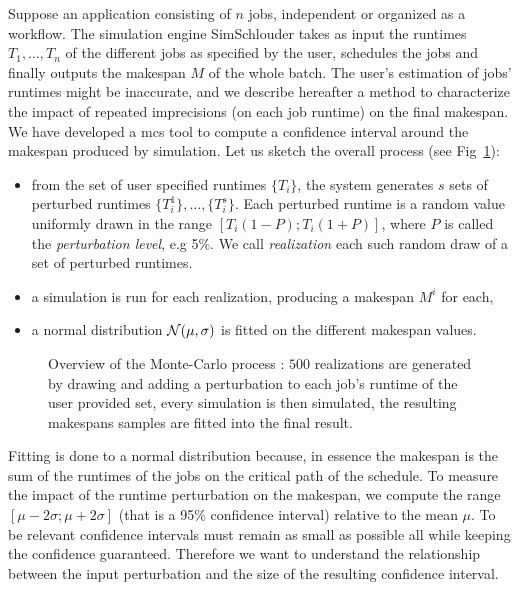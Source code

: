 \documentclass[10pt,conference,compsocconf]{IEEEtran}
\begin{document}
Suppose an  application consisting of  $n$ jobs,  independent or organized  as a
workflow.   The  simulation engine  SimSchlouder  takes  as input  the  runtimes
$T_1, \ldots ,  T_n$ of the different  jobs as specified by  the user, schedules
the jobs and  finally outputs the makespan  $M$ of the whole  batch.  The user's
estimation of  jobs' runtimes might be  inaccurate, and we describe  hereafter a
method to characterize the impact of repeated imprecisions (on each job runtime)
on the  final makespan.  We  have developed a \ac{mcs}  tool to compute a
confidence interval around the makespan produced   by   simulation.   Let   us
sketch   the   overall   process   (see Fig~\ref{fig:mc-process}):
\begin{itemize} 
\item from  the set of user  specified runtimes $\{T_i\}$, the  system generates
  $s$ sets of perturbed runtimes  $\{T_i^1\}, \ldots, \{T_i^s\}$. Each perturbed
  runtime    is   a    random   value    uniformly   drawn    in   the    range
  $[T_i (1-P); T_i  (1+P)]$, where $P$ is called  the \emph{perturbation level},
  e.g  5\%.  We call \emph{realization}  each  such random  draw  of  a set  of
  perturbed runtimes.
\item a simulation  is run for each realization, producing  a makespan $M^i$ for
  each,
\item  a  normal  distribution  ${\cal N}(\mu,\sigma)$  is  fitted  on
		the different  makespan values.
\end{itemize}
\begin{figure}
	\centering
	\resizebox{0.5\textwidth}{!}{%
		
		}
                \caption{Overview   of   the   Monte-Carlo   process   :   $500$
                  realizations   are  generated   by   drawing   and  adding   a
                  perturbation to each  job's runtime of the  user provided set,
                  every simulation  is then  simulated, the  resulting makespans
		  samples are fitted into the final result. \label{fig:mcprocess}
		  }
      \label{fig:mc-process}
\end{figure}
Fitting is done to a normal distribution because, in essence the makespan is the
sum  of the  runtimes of  the jobs  on the  critical path  of the  schedule.  To
measure the impact  of the runtime perturbation on the  makespan, we compute the
range $[\mu-2\sigma;\mu+2\sigma]$ (that is  a 95\% confidence interval) relative
to  the mean  $\mu$. 
To be relevant confidence intervals must remain as small as possible all while
keeping the confidence guaranteed. Therefore we want to understand the relationship
between the input perturbation and the size of the resulting confidence interval.
\end{document}
